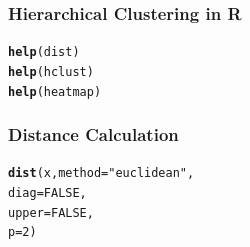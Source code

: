 \documentclass[UTF8]{beamer}\usepackage[]{graphicx}\usepackage[]{color}
\makeatletter
\newcommand{\hlnum}[1]{\textcolor[rgb]{0.686,0.059,0.569}{#1}}%
\newcommand{\hlstr}[1]{\textcolor[rgb]{0.192,0.494,0.8}{#1}}%
\newcommand{\hlstd}[1]{\textcolor[rgb]{0.345,0.345,0.345}{#1}}%
\newcommand{\hlkwc}[1]{\textcolor[rgb]{0.333,0.667,0.333}{#1}}%
\newcommand{\hlkwd}[1]{\textcolor[rgb]{0.737,0.353,0.396}{\textbf{#1}}}%
\newenvironment{kframe}{%
 \def\at@end@of@kframe{}%
 \ifinner\ifhmode%
  \def\at@end@of@kframe{\end{minipage}}%
  \begin{minipage}{\columnwidth}%
 \fi\fi%
 \def\FrameCommand##1{\hskip\@totalleftmargin \hskip-\fboxsep
 \colorbox{shadecolor}{##1}\hskip-\fboxsep
     \hskip-\linewidth \hskip-\@totalleftmargin \hskip\columnwidth}%
 \MakeFramed {\advance\hsize-\width
   \@totalleftmargin\z@ \linewidth\hsize
   \@setminipage}}%
 {\par\unskip\endMakeFramed%
 \at@end@of@kframe}
\newenvironment{knitrout}{}{} %
\makeatother
\begin{document}
\begin{frame}[fragile]
  \frametitle{Hierarchical Clustering in R}

\begin{knitrout}
\color{fgcolor}\begin{kframe}
\begin{alltt}
 \hlkwd{help}\hlstd{(dist)}
 \hlkwd{help}\hlstd{(hclust)}
 \hlkwd{help}\hlstd{(heatmap)}
\end{alltt}
\end{kframe}
\end{knitrout}
\end{frame}

\begin{frame}[fragile]
  \frametitle{Distance Calculation}

\begin{knitrout}
\color{fgcolor}\begin{kframe}
\begin{alltt}
 \hlkwd{dist}\hlstd{(x,} \hlkwc{method} \hlstd{=} \hlstr{"euclidean"}\hlstd{,}
 \hlkwc{diag} \hlstd{=} \hlnum{FALSE}\hlstd{,}
 \hlkwc{upper} \hlstd{=} \hlnum{FALSE}\hlstd{,}
 \hlkwc{p} \hlstd{=} \hlnum{2}\hlstd{)}
\end{alltt}
\end{kframe}
\end{knitrout}
\end{frame}
\end{document}

